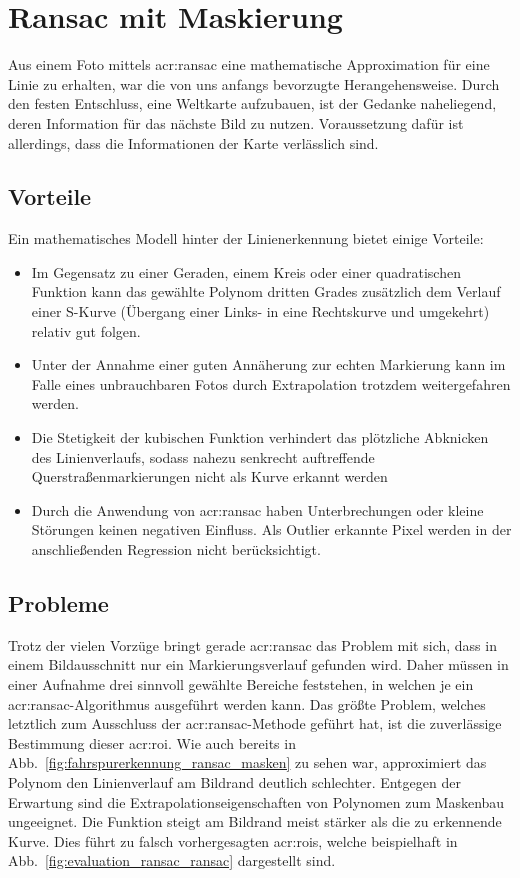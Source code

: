 \section{Ransac mit Maskierung \dcfirstauthorshort}

Aus einem Foto mittels \gls{acr:ransac} eine mathematische Approximation für eine Linie zu erhalten, war die von uns anfangs bevorzugte Herangehensweise. Durch den festen Entschluss, eine Weltkarte aufzubauen, ist der Gedanke naheliegend, deren Information für das nächste Bild zu nutzen. Voraussetzung dafür ist allerdings, dass die Informationen der Karte verlässlich sind.

\subsection{Vorteile}
Ein mathematisches Modell hinter der Linienerkennung bietet einige Vorteile:
\begin{itemize}
\item Im Gegensatz zu einer Geraden, einem Kreis oder einer quadratischen Funktion kann das gewählte Polynom dritten Grades zusätzlich dem Verlauf einer S-Kurve (Übergang einer Links- in eine Rechtskurve und umgekehrt) relativ gut folgen. \item Unter der Annahme einer guten Annäherung zur echten Markierung kann im Falle eines unbrauchbaren Fotos durch Extrapolation trotzdem weitergefahren werden. 
\item Die Stetigkeit der kubischen Funktion verhindert das plötzliche Abknicken des Linienverlaufs, sodass nahezu senkrecht auftreffende Querstraßenmarkierungen nicht als Kurve erkannt werden
\item Durch die Anwendung von \gls{acr:ransac} haben Unterbrechungen oder kleine Störungen keinen negativen Einfluss. Als Outlier erkannte Pixel werden in der anschließenden Regression nicht berücksichtigt.
\end{itemize}

\subsection{Probleme}
Trotz der vielen Vorzüge bringt gerade \gls{acr:ransac} das Problem mit sich, dass in einem Bildausschnitt nur ein Markierungsverlauf gefunden wird. Daher müssen in einer Aufnahme drei sinnvoll gewählte Bereiche feststehen, in welchen je ein \gls{acr:ransac}-Algorithmus ausgeführt werden kann. 
Das größte Problem, welches letztlich zum Ausschluss der \gls{acr:ransac}-Methode geführt hat, ist die zuverlässige Bestimmung dieser \gls{acr:roi}. Wie auch bereits in Abb.~\ref{fig:fahrspurerkennung_ransac_masken} zu sehen war, approximiert das Polynom den Linienverlauf am Bildrand deutlich schlechter. Entgegen der Erwartung sind die Extrapolationseigenschaften von Polynomen zum Maskenbau ungeeignet. Die Funktion steigt am Bildrand meist stärker als die zu erkennende Kurve. Dies führt zu falsch vorhergesagten \glspl{acr:roi}, welche beispielhaft in Abb.~\ref{fig:evaluation_ransac_ransac} dargestellt sind.

